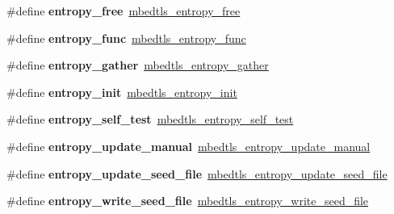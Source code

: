 \begin{DoxyCompactItemize}
\#define {\bfseries entropy\+\_\+free}~\mbox{\hyperlink{entropy_8h_a06778439f8a0e2daa2d3b444e06ad8dd}{mbedtls\+\_\+entropy\+\_\+free}}
\item 
\mbox{\label{compat-1_83_8h_ade3c1917995519ddf981bf705361e411}} 
\#define {\bfseries entropy\+\_\+func}~\mbox{\hyperlink{entropy_8h_a81765f6cdf4e5111bcb9f4324f3234cb}{mbedtls\+\_\+entropy\+\_\+func}}
\item 
\mbox{\label{compat-1_83_8h_a8810be69f902c469054611f347924a74}} 
\#define {\bfseries entropy\+\_\+gather}~\mbox{\hyperlink{entropy_8h_ac49de4b842e7d56cfcd1088286a09b7d}{mbedtls\+\_\+entropy\+\_\+gather}}
\item 
\mbox{\label{compat-1_83_8h_a9736e23bf2d115f717719712e7d2bb2c}} 
\#define {\bfseries entropy\+\_\+init}~\mbox{\hyperlink{entropy_8h_aa901e027093c6fe65dee5760db78aced}{mbedtls\+\_\+entropy\+\_\+init}}
\item 
\mbox{\label{compat-1_83_8h_aadd737d73435e92b38f3fa125a09c2eb}} 
\#define {\bfseries entropy\+\_\+self\+\_\+test}~\mbox{\hyperlink{entropy_8h_ad31b29e855ba719ba5282e2da4f5c338}{mbedtls\+\_\+entropy\+\_\+self\+\_\+test}}
\item 
\mbox{\label{compat-1_83_8h_a6604b004880cd270e0b4a2c6411e3080}} 
\#define {\bfseries entropy\+\_\+update\+\_\+manual}~\mbox{\hyperlink{entropy_8h_aa79492f288cc3202ea455564be855d64}{mbedtls\+\_\+entropy\+\_\+update\+\_\+manual}}
\item 
\mbox{\label{compat-1_83_8h_a345270b7149bf8c15636f9a21bd7cd0c}} 
\#define {\bfseries entropy\+\_\+update\+\_\+seed\+\_\+file}~\mbox{\hyperlink{entropy_8h_a3d72b19c00eb0cabb319d3d81599a57a}{mbedtls\+\_\+entropy\+\_\+update\+\_\+seed\+\_\+file}}
\item 
\mbox{\label{compat-1_83_8h_a957c430e492215f9cb393fbc9a51b602}} 
\#define {\bfseries entropy\+\_\+write\+\_\+seed\+\_\+file}~\mbox{\hyperlink{entropy_8h_abffb5c2d08b9cc94788910d463ce3181}{mbedtls\+\_\+entropy\+\_\+write\+\_\+seed\+\_\+file}}
\item 
\mbox{\label{compat-1_83_8h_a843417652e481cb104bad436afbac14d}} 

\end{DoxyCompactItemize}
